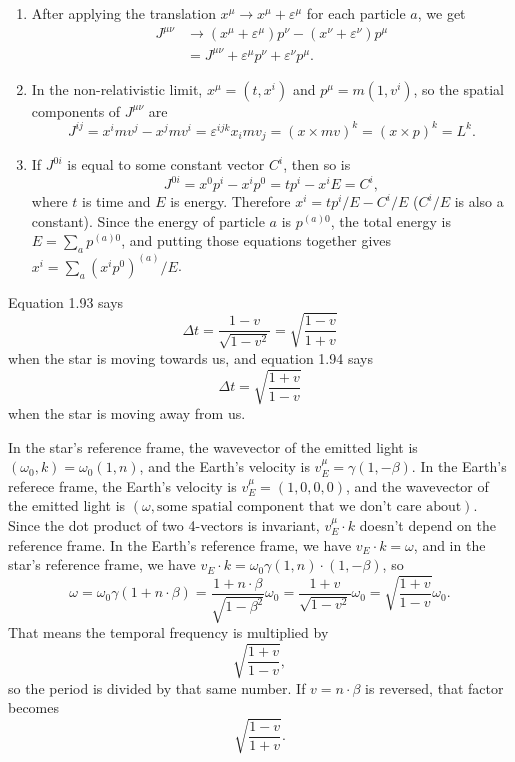 \documentclass{article}
\begin{document}
\bigskip
\par
\begin{prob}
\end{prob}
\begin{enumerate}[label=(\alph*)]
    \item After applying the translation $x^\mu \rightarrow x^\mu + \varepsilon^\mu$ for each particle $a$, we get
        \begin{align*}
            J^{\mu \nu} &\rightarrow \left( x^\mu + \varepsilon^\mu \right) p^\nu - \left( x^\nu + \varepsilon^\nu \right) p^\mu \\
                        &= J^{\mu \nu} + \varepsilon^\mu p^\nu + \varepsilon^\nu p^\mu.
        \end{align*}
    \item In the non-relativistic limit, $x^\mu = (t, x^i)$ and $p^\mu = m (1, v^i)$, so the spatial components of $J^{\mu \nu}$ are
        \[ J^{i j} = x^i mv^j - x^j mv^i = \varepsilon^{ijk} x_i mv_j = (x \times mv)^k = (x \times p)^k = L^k. \]
    \item If $J^{0i}$ is equal to some constant vector $C^i$, then so is
        \[ J^{0i} = x^0 p^i - x^i p^0 = tp^i - x^i E = C^i, \]
        where $t$ is time and $E$ is energy. Therefore $x^i = tp^i/E - C^i/E$ ($C^i/E$ is also a constant). Since the energy of particle $a$ is $p^{(a)0}$, the total energy is $E = \sum_a p^{(a)0}$, and putting those equations together gives $x^i = \sum_a (x^ip^0)^{(a)}/E$.
\end{enumerate}

\bigskip
\par
\begin{prob}
    Equation 1.93 says
    \[ \Delta t = \frac{1-v}{\sqrt{1-v^2}} = \sqrt{ \frac{1-v}{1+v}} \]
    when the star is moving towards us, and equation 1.94 says
    \[ \Delta t = \sqrt{ \frac{1+v}{1-v}} \]
    when the star is moving away from us.
\end{prob}
In the star's reference frame, the wavevector of the emitted light is $(\omega_0, k) = \omega_0 (1, n)$, and the Earth's velocity is $v_E^\mu = \gamma (1, -\beta)$. In the Earth's referece frame, the Earth's velocity is $v_E^\mu = (1, 0, 0, 0)$, and the wavevector of the emitted light is $(\omega, \text{some spatial component that we don't care about})$. Since the dot product of two 4-vectors is invariant, $v_E^\mu \cdot k$ doesn't depend on the reference frame. In the Earth's reference frame, we have $v_E \cdot k = \omega$, and in the star's reference frame, we have $v_E \cdot k = \omega_0 \gamma (1, n) \cdot (1, - \beta)$, so
\[ \omega = \omega_0 \gamma (1 + n \cdot \beta) = \frac{1 + n \cdot \beta}{\sqrt{1-\beta^2}} \omega_0 = \frac{1 + v}{\sqrt{1 - v^2}} \omega_0 = \sqrt{ \frac{1+v}{1-v}} \omega_0. \]
That means the temporal frequency is multiplied by
\[ \sqrt{\frac{1+v}{1-v}}, \]
so the period is divided by that same number. If $v = n \cdot \beta$ is reversed, that factor becomes
\[ \sqrt{\frac{1-v}{1+v}}. \]


\end{document}
